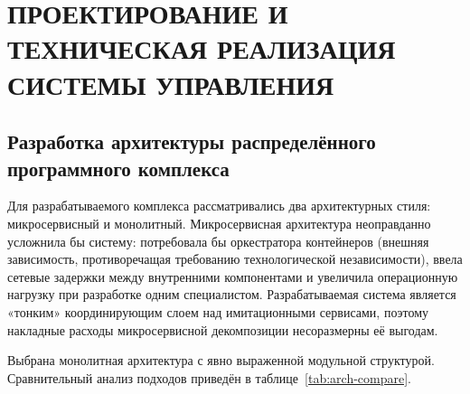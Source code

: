 ﻿\chapter{{\fontsize{14pt}{21pt}\selectfont\MakeUppercase{ПРОЕКТИРОВАНИЕ И ТЕХНИЧЕСКАЯ РЕАЛИЗАЦИЯ СИСТЕМЫ УПРАВЛЕНИЯ}}}
\label{cha:design}

\section{Разработка архитектуры распределённого программного комплекса}


Для разрабатываемого комплекса рассматривались два архитектурных стиля: микросервисный и монолитный. Микросервисная архитектура неоправданно усложнила бы систему: потребовала бы оркестратора контейнеров (внешняя зависимость, противоречащая требованию технологической независимости), ввела сетевые задержки между внутренними компонентами и увеличила операционную нагрузку при разработке одним специалистом. Разрабатываемая система является «тонким» координирующим слоем над имитационными сервисами, поэтому накладные расходы микросервисной декомпозиции несоразмерны её выгодам.

Выбрана монолитная архитектура с явно выраженной модульной структурой. Сравнительный анализ подходов приведён в таблице~\ref{tab:arch-compare}.


